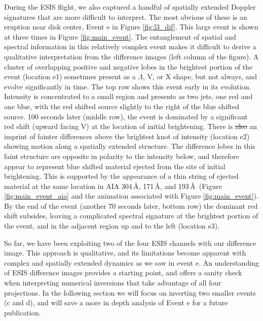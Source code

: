     	During the ESIS flight, we also captured a handful of spatially extended Doppler signatures that are more difficult to interpret.
    	The most obvious of these is an eruption near disk center, Event e in Figure \ref{fig:l3_dif}.
    	This large event is shown at three times in Figure \ref{fig:main_event}.
    	The entanglement of spatial and spectral information in this relatively complex event makes it difficult to derive a qualitative interpretation from the difference images (left column of the figure).
    	A cluster of overlapping positive and negative lobes in the brightest portion of the event (location e1) sometimes present as a $\Lambda$, V, or X shape, but not always, and evolve significantly in time.
    	The top row shows this event early in its evolution. 
    	Intensity is concentrated to a small region and presents as two jets, one red and one blue, with the red shifted source slightly to the right of the blue shifted source. 
    	100 seconds later (middle row), the event is dominated by a significant red shift (upward facing V) at the location of initial brightening. 
    	There is \sout{also} an imprint of fainter differences above the brightest knot of intensity (location e2) showing motion along a spatially extended structure.
    	The difference lobes in this faint structure are opposite in polarity to the intensity below, and therefore appear to represent  blue shifted material ejected from the site of initial brightening.
    	This is supported by the appearance of a thin string of ejected material at the same location in AIA 304\,\AA, 171\,\AA, and 193\,\AA \ (Figure \ref{fig:main_event_aia} and the animation associated with Figure \ref{fig:main_event}).
    	By the end of the event (another 70 seconds later, bottom row) the dominant red shift subsides, leaving a complicated spectral signature at the brightest portion of the event, and in the adjacent region up and to the left (location e3).  
    	
    	So far, we have been exploiting two of the four ESIS channels with our difference image. This approach is qualitative,
    	and its limitations become apparent with complex and spatially extended dynamics as we saw in event e.
    	An understanding of ESIS difference images provides a starting point,
    	and offers a sanity check when interpreting numerical inversions that take advantage of all four projections.
    	In the following section we will focus on inverting two smaller events (c and d), and will save a more in depth analysis of Event e for a future publication. 
    	
